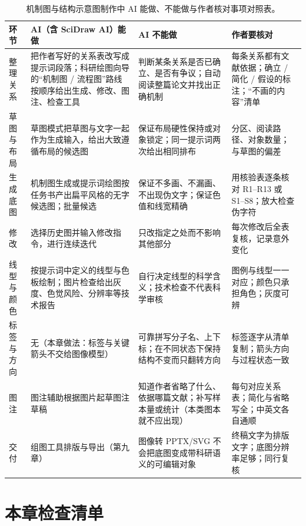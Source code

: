 \begin{table}[htbp]\centering\footnotesize
\caption{机制图与结构示意图制作中 AI 能做、不能做与作者核对事项对照表。}\label{tab:ch07-02}
\begin{tabularx}{\linewidth}{lYYY}
\toprule
\textbf{环节} & \textbf{AI（含 SciDraw AI）能做} & \textbf{AI 不能做} & \textbf{作者要核对} \\
\midrule
整理关系 & 把作者写好的关系表改写成提示词段落；科研绘图向导的“机制图 / 流程图”路线按顺序给出生成、修改、图注、检查工具 & 判断某条关系是否已确立、是否有争议；自动阅读整篇论文并找出正确机制 & 每条关系都有文献依据；确立 / 简化 / 假设的标注；“不画的内容”清单 \\
草图与布局 & 草图模式把草图与文字一起作为生成输入，给出大致遵循布局的候选图 & 保证布局硬性保持或对象锁定；同一提示词两次给出相同排布 & 分区、阅读路径、对象数量；与草图的偏差 \\
生成底图 & 机制图生成或提示词绘图按任务书产出扁平风格的无字候选图；批量候选 & 保证不多画、不漏画、不出现伪文字；保证色值和线宽精确 & 用核验表逐条核对 R1–R13 或 S1–S8；放大检查伪字符 \\
修改 & 选择历史图并输入修改指令，进行连续迭代 & 只改指定之处而不影响其他部分 & 每次修改后全表复核，记录意外变化 \\
线型与颜色 & 按提示词中定义的线型与色板绘制；图片检查给出灰度、色觉风险、分辨率等技术报告 & 自行决定线型的科学含义；技术检查不代表科学审核 & 图例与线型一一对应；颜色只承担角色；灰度可辨 \\
标签与方向 & 无（本章做法：标签与关键箭头不交给图像模型） & 可靠拼写分子名、上下标；在不同状态下保持结构不变而只翻转方向 & 标签逐字从清单复制；箭头方向与过程状态一致 \\
图注 & 图注辅助根据图片起草图注草稿 & 知道作者省略了什么、依据哪篇文献；补写样本量或统计（本类图本就不应出现） & 每句对应关系表；简化与省略写全；中英文各自通顺 \\
交付 & 组图工具排版与导出（第九章） & 图像转 PPTX/SVG 不会把底图变成带科研语义的可编辑对象 & 终稿文字为排版文字；底图分辨率足够；同行复核 \\
\bottomrule
\end{tabularx}
\end{table}

\section{本章检查清单}


